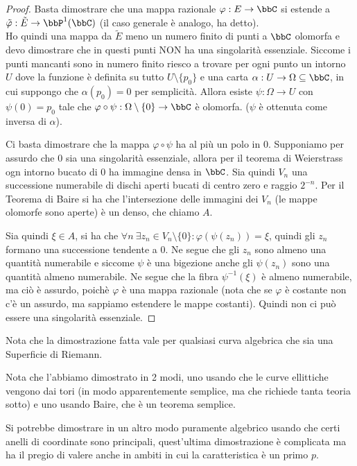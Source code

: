 \begin{proof}
Basta dimostrare che una mappa razionale $\varphi:E\rightarrow \bbC$ si estende a $\tilde{\varphi}:\tilde{E}\rightarrow\bbP^1(\bbC)$ (il caso generale è analogo, ha detto).\\
Ho quindi una mappa da $\tilde{E}$ meno un numero finito di punti a $\bbC$ olomorfa e devo dimostrare che in questi punti NON ha una singolarità essenziale. Siccome i punti mancanti sono in numero finito riesco a trovare per ogni punto un intorno $U$ dove la funzione è definita su tutto $U \setminus \{ p_0\}$ e una carta $\alpha: U\rightarrow \Omega\subseteq\bbC$, in cui suppongo che $\alpha(p_0)=0$ per semplicità. Allora esiste $\psi:\Omega\rightarrow U$ con $\psi(0)=p_0$ tale che $\varphi\circ\psi:\Omega \setminus \{ 0\}\rightarrow \bbC$ è olomorfa. ($\psi$ è ottenuta come inversa di $\alpha$).

Ci basta dimostrare che la mappa $\varphi\circ\psi$ ha al più un polo in $0$.
Supponiamo per assurdo che $0$ sia una singolarità essenziale, allora per il teorema di Weierstrass ogn intorno bucato di $0$ ha immagine densa in $\bbC$. Sia quindi $V_n$ una successione numerabile di dischi aperti bucati di centro zero e raggio $2^{-n}$. Per il Teorema di Baire si ha che l'intersezione delle immagini dei $V_n$ (le mappe olomorfe sono aperte) è un denso, che chiamo $A$.

Sia quindi $\xi\in A$, si ha che $\forall n \ \exists z_n\in V_n \setminus \{ 0 \} : \varphi ( \psi(z_n ))=\xi$, quindi gli $z_n$ formano una successione tendente a $0$. Ne segue che gli $z_n$ sono almeno una quantità numerabile e siccome $\psi$ è una bigezione anche gli $\psi(z_n)$ sono una quantità almeno numerabile. Ne segue che la fibra $\psi^{-1} (\xi )$ è almeno numerabile, ma ciò è assurdo, poichè $\varphi$ è una mappa razionale (nota che se $\varphi$ è costante non c'è un assurdo, ma sappiamo estendere le mappe costanti). Quindi non ci può essere una singolarità essenziale.
\end{proof}


\begin{osservazione}
Nota che la dimostrazione fatta vale per qualsiasi curva algebrica che sia una Superficie di Riemann.

Nota che l'abbiamo dimostrato in 2 modi, uno usando che le curve ellittiche vengono dai tori (in modo apparentemente semplice, ma che richiede tanta teoria sotto) e uno usando Baire, che è un teorema semplice.

Si potrebbe dimostrare in un altro modo puramente algebrico usando che certi anelli di coordinate sono principali, quest'ultima dimostrazione è complicata ma ha il pregio di valere anche in ambiti in cui la caratteristica è un primo $p$.
\end{osservazione}

